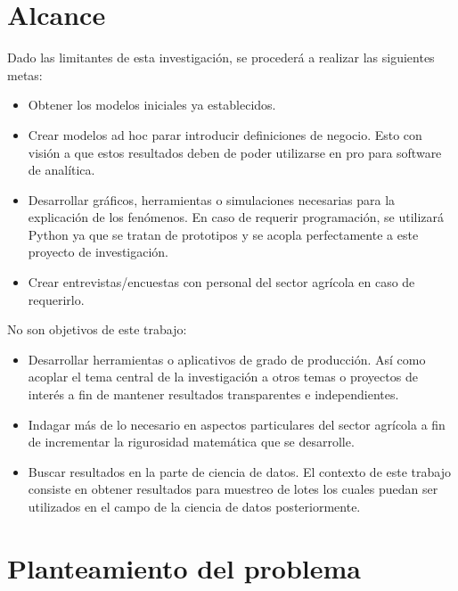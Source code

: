 \documentclass{report}
\begin{document}
\section{Alcance}

Dado las limitantes de esta investigación, se procederá a realizar las siguientes metas:

\begin{itemize}
    \item Obtener los modelos iniciales ya establecidos.
    
    \item Crear modelos ad hoc parar introducir definiciones de negocio. Esto con visión a que estos resultados deben de poder utilizarse en pro para software de analítica.
    
    \item Desarrollar gráficos, herramientas o simulaciones necesarias para la explicación de los fenómenos. En caso de requerir programación, se utilizará Python ya que se tratan de prototipos y se acopla perfectamente a este proyecto de investigación.
    
    \item Crear entrevistas/encuestas con personal del sector agrícola en caso de requerirlo.
\end{itemize}

\bigbreak

No son objetivos de este trabajo:

\begin{itemize}
    \item Desarrollar herramientas o aplicativos de grado de producción. Así como acoplar el tema central de la investigación a otros temas o proyectos de interés a fin de mantener resultados transparentes e independientes.
    
    \item Indagar más de lo necesario en aspectos particulares del sector agrícola a fin de incrementar la rigurosidad matemática que se desarrolle.
    
    \item Buscar resultados en la parte de ciencia de datos. El contexto de este trabajo consiste en obtener resultados para muestreo de lotes los cuales puedan ser utilizados en el campo de la ciencia de datos posteriormente.
\end{itemize}

\section{Planteamiento del problema}
\end{document}
